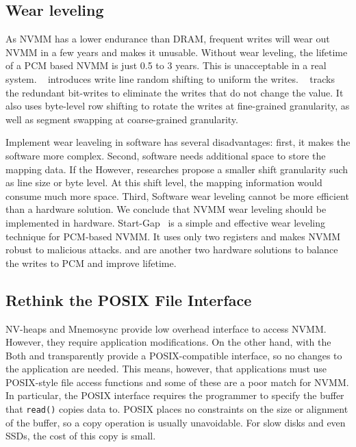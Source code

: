 \subsection{Wear leveling}
\label{sec:wear}
As NVMM has a lower endurance than DRAM, frequent writes will wear out
NVMM in a few years and makes it unusable. Without wear leveling, the lifetime
of a PCM based NVMM is just 0.5 to 3 years. This is unacceptable in a real
system. ~\cite{PCMHierarchy} introduces write line random shifting to uniform
the writes. ~\cite{PCM_EfficientMainMemory} tracks the redundant bit-writes to
eliminate the writes that do not change the value. It also uses byte-level row
shifting to rotate the writes at fine-grained granularity, as well as segment
swapping at coarse-grained granularity.

Implement wear leaveling in software has several disadvantages: first, it makes
the software more complex. Second, software needs additional space to store
the mapping data. If the 
However, researches propose a smaller shift granularity such as line size
or byte level.
At this shift level, the mapping information would consume much more space.
Third, Software wear leveling cannot be more efficient
than a hardware solution. We conclude that NVMM wear leveling should be
implemented in hardware. Start-Gap~\cite{startgap1} is a simple and effective
wear leveling technique for PCM-based NVMM. It uses only two registers and
makes NVMM robust to malicious attacks. \cite{secrefresh} and \cite{freep}
are another two hardware solutions to balance the writes to PCM and improve
lifetime.

\subsection{Rethink the POSIX File Interface}
\label{sec:noposix}

NV-heaps and Mnemosync provide low overhead interface to access NVMM. However,
they require application modifications.
On the other hand, with the Both \DAChell{} and \CChell{} transparently
 provide a POSIX-compatible
interface, so no changes to the application are needed.  This means, however,
 that applications must use POSIX-style file access functions and some of these
 are a poor match for NVMM.
In particular, the POSIX interface
requires the programmer to specify the buffer that \texttt{read()} copies data to.
POSIX places no constraints on the size
or alignment of the buffer, so a copy operation is usually unavoidable.  For
slow disks and even SSDs, the cost of this copy is small.

